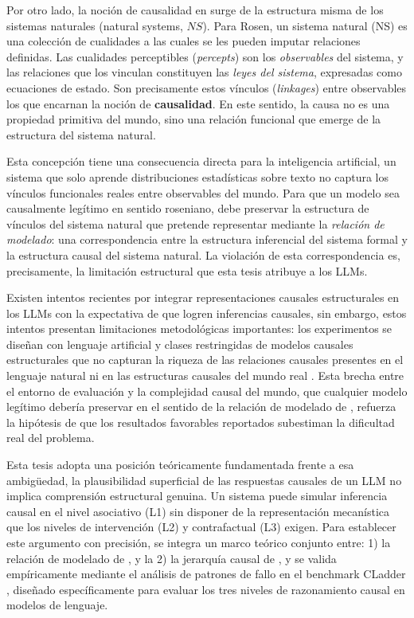\documentclass{article}
\begin{document}
Por otro lado, la noción de causalidad en \textcite{rosen2012anticipatory} surge de la estructura misma de los sistemas naturales 
(natural systems, $NS$). Para Rosen, un sistema natural (NS) es una colección de cualidades a las cuales se les pueden imputar relaciones definidas. 
Las cualidades perceptibles (\textit{percepts}) son los \textit{observables} del sistema, y las relaciones que los vinculan 
 constituyen las \textit{leyes del sistema}, expresadas como ecuaciones de estado. Son precisamente estos 
 vínculos (\textit{linkages}) entre observables los que encarnan la noción de \textbf{causalidad}. En este sentido, 
la causa no es una propiedad primitiva del mundo, sino una relación funcional que emerge de la estructura del sistema natural.

Esta concepción tiene una consecuencia directa para la inteligencia artificial, un sistema que solo aprende 
distribuciones estadísticas sobre texto no captura los vínculos funcionales reales entre observables del mundo. 
Para que un modelo sea causalmente legítimo en sentido roseniano, debe preservar la estructura de vínculos del 
sistema natural que pretende representar mediante la \textit{relación de modelado}: una correspondencia entre 
la estructura inferencial del sistema formal y la estructura causal del sistema natural. La violación de esta 
correspondencia es, precisamente, la limitación estructural que esta tesis atribuye a los LLMs.

Existen intentos recientes por integrar representaciones causales 
estructurales en los LLMs con la expectativa de que logren inferencias 
causales, sin embargo, estos intentos presentan limitaciones 
metodológicas importantes: los experimentos se diseñan con lenguaje 
artificial y clases restringidas de modelos causales estructurales que 
no capturan la riqueza de las relaciones causales presentes en el 
lenguaje natural ni en las estructuras causales del mundo real 
\parencite{butkus2025causal, li2023counterfactual}. Esta brecha entre el entorno de evaluación 
y la complejidad causal del mundo, que cualquier modelo legítimo debería 
preservar en el sentido de la relación de modelado de 
\textcite{rosen2012anticipatory}, refuerza la hipótesis de que los 
resultados favorables reportados subestiman la dificultad real del problema.

Esta tesis adopta una posición teóricamente 
fundamentada frente a esa ambigüedad, la plausibilidad superficial de las 
respuestas causales de un LLM no implica comprensión estructural genuina. 
Un sistema puede simular inferencia causal en el nivel asociativo (L1) sin 
disponer de la representación mecanística que los niveles de intervención 
(L2) y contrafactual (L3) exigen. Para establecer este argumento con 
precisión, se integra un marco teórico conjunto entre: 1) la relación de modelado de 
\textcite{rosen2012anticipatory}, y la 2) la jerarquía causal de 
\textcite{pearl2009causality}, y se valida 
empíricamente mediante el análisis de patrones de fallo en el benchmark 
CLadder \parencite{jin2023cladder}, diseñado específicamente para evaluar 
los tres niveles de razonamiento causal en modelos de lenguaje.
\end{document}
